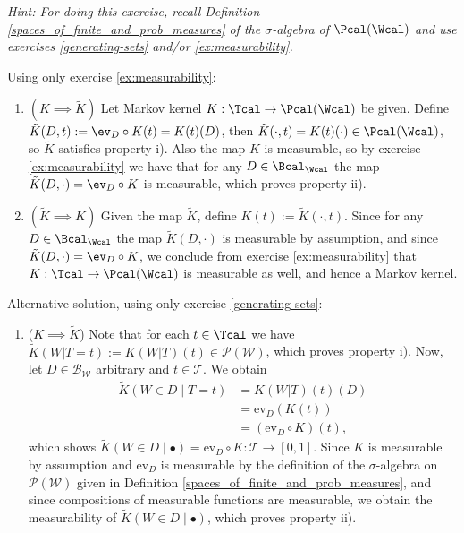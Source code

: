 \begin{enumerate}[label=2.\arabic*]
    \emph{Hint: For doing this exercise, recall Definition \ref*{spaces_of_finite_and_prob_measures} of the $\sigma$-algebra of $\Pcal(\Wcal)$ and use exercises \ref{generating-sets} and/or \ref{ex:measurability}.}
    \begin{gradedsolution}
        Using only exercise \ref{ex:measurability}:
        \begin{enumerate}
            \item {} $(K\implies \tilde{K})$ Let Markov kernel $K: \Tcal \to \Pcal(\Wcal)$ be given. Define $\tilde{K}(D, t) := \ev_D \circ K(t) = K(t)(D)$, then $\tilde{K}(\cdot, t) = K(t)(\cdot) \in \Pcal(\Wcal)$, so $\tilde{K}$ satisfies property i). Also the map $K$ is measurable, so by exercise \ref{ex:measurability} we have that for any $D\in \Bcal_{\Wcal}$ the map $\tilde{K}(D, \cdot) = \ev_D\circ K$ is measurable, which proves property ii).
            \item {} $(\tilde{K}\implies K)$ Given the map $\tilde{K}$, define $K(t) := \tilde{K}(\cdot, t)$. Since for any $D\in \Bcal_{\Wcal}$ the map $\tilde{K}(D, \cdot)$ is measurable by assumption, and since $\tilde{K}(D, \cdot) = \ev_D \circ K$, we conclude from exercise \ref{ex:measurability} that $K:\Tcal \to \Pcal(\Wcal)$ is measurable as well, and hence a Markov kernel.
        \end{enumerate}
    \end{gradedsolution}
    \begin{gradedsolution}
        Alternative solution, using only exercise \ref{generating-sets}:
        \begin{enumerate}
            \item {} ($K\implies \tilde{K}$) Note that for each $t\in\Tcal$ we have $\tilde{K}(W | T=t) := K(W|T)(t) \in \mathcal{P}(\mathcal{W})$, which proves property i).
            Now, let $D \in \mathcal{B}_{\mathcal{W}}$ arbitrary and $t \in \mathcal{T}$.
            We obtain
            \begin{align*}
                \tilde{K}(W\in D \mid T=t) & = K(W|T)(t)(D)              \\
                                           & = \text{ev}_D(K(t))         \\
                                           & = (\text{ev}_D \circ K)(t),
            \end{align*}
            which shows $\tilde{K}(W\in D \mid \bullet) = \text{ev}_D \circ K: \mathcal{T} \to [0,1]$.
            Since $K$ is measurable by assumption and $\text{ev}_D$ is measurable by the definition of the $\sigma$-algebra on $\mathcal{P}(\mathcal{W})$ given in Definition \ref*{spaces_of_finite_and_prob_measures}, and since compositions of measurable functions are measurable, we obtain the measurability of $\tilde{K}(W\in D \mid \bullet)$, which proves property ii).


\end{enumerate}
\end{gradedsolution}
\end{enumerate}
